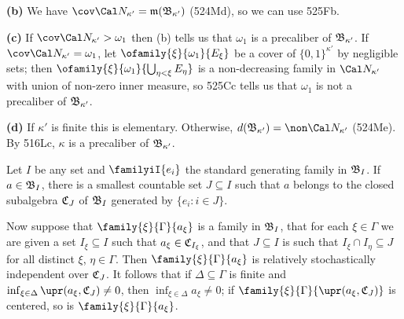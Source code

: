 {\medskip

{\bf (b)} We have $\cov\Cal N_{\kappa'}=\frak m(\frak B_{\kappa'})$
(524Md), so we can use 525Fb.

\medskip

{\bf (c)} If $\cov\Cal N_{\kappa'}>\omega_1$ then (b) tells us that
$\omega_1$ is a precaliber of $\frak B_{\kappa'}$.   If
$\cov\Cal N_{\kappa'}=\omega_1$, let $\ofamily{\xi}{\omega_1}{E_{\xi}}$
be a cover of $\{0,1\}^{\kappa'}$ by negligible sets;  then
$\ofamily{\xi}{\omega_1}{\bigcup_{\eta<\xi}E_{\eta}}$ is a
non-decreasing
family in $\Cal N_{\kappa'}$ with union of non-zero inner measure, so
525Cc tells us that $\omega_1$ is not a precaliber of
$\frak B_{\kappa'}$.

\medskip

{\bf (d)} If $\kappa'$ is finite this is elementary.   Otherwise,
$d(\frak B_{\kappa'})=\non\Cal N_{\kappa'}$ (524Me).   By 516Lc,
$\kappa$ is a precaliber of $\frak B_{\kappa'}$.
}%

   Let $I$ be any
set and $\familyiI{e_i}$ the standard generating family in $\frak B_I$.
If $a\in\frak B_I$,
there is a smallest countable set $J\subseteq I$ such that $a$ belongs
to the closed subalgebra $\frak C_J$ of $\frak B_I$ generated by
$\{e_i:i\in J\}$.   

Now suppose that $\family{\xi}{\Gamma}{a_{\xi}}$ is a family in
$\frak B_I$, that for each $\xi\in\Gamma$ we are given a set
$I_{\xi}\subseteq I$ such that $a_{\xi}\in\frak C_{I_{\xi}}$, and that
$J\subseteq I$ is such that $I_{\xi}\cap I_{\eta}\subseteq J$ for all
distinct $\xi$, $\eta\in\Gamma$.   Then $\family{\xi}{\Gamma}{a_{\xi}}$
is relatively stochastically independent over
$\frak C_J$.   
It follows that if $\Delta\subseteq\Gamma$ is finite and
$\inf_{\xi\in\Delta}\upr(a_{\xi},\frak C_J)\ne 0$, then
$\inf_{\xi\in\Delta}a_{\xi}\ne 0$;
\cmmnt{in particular,} if
$\family{\xi}{\Gamma}{\upr(a_{\xi},\frak C_J)}$ is centered, so is
$\family{\xi}{\Gamma}{a_{\xi}}$.

